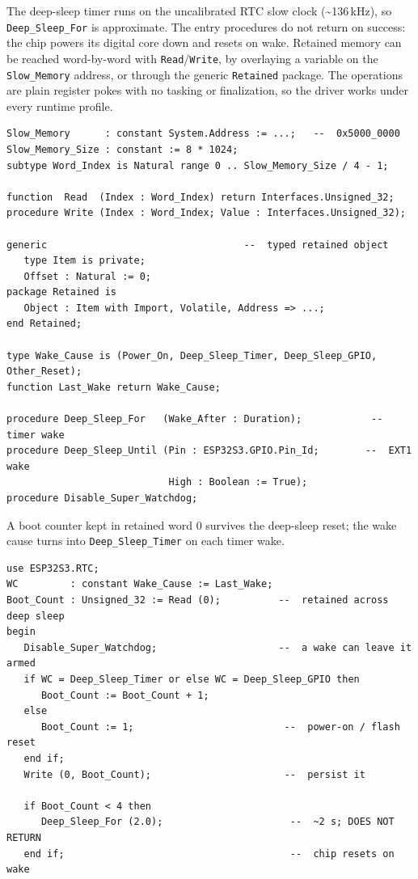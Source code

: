 The deep-sleep timer runs on the uncalibrated RTC slow clock
(\textasciitilde136\,kHz), so \texttt{Deep\_Sleep\_For} is approximate. The entry
procedures do not return on success: the chip powers its digital core down and
resets on wake. Retained memory can be reached word-by-word with
\texttt{Read}/\texttt{Write}, by overlaying a variable on the \texttt{Slow\_Memory}
address, or through the generic \texttt{Retained} package. The operations are plain
register pokes with no tasking or finalization, so the driver works under every
runtime profile.

\begin{lstlisting}
Slow_Memory      : constant System.Address := ...;   --  0x5000_0000
Slow_Memory_Size : constant := 8 * 1024;
subtype Word_Index is Natural range 0 .. Slow_Memory_Size / 4 - 1;

function  Read  (Index : Word_Index) return Interfaces.Unsigned_32;
procedure Write (Index : Word_Index; Value : Interfaces.Unsigned_32);

generic                                  --  typed retained object
   type Item is private;
   Offset : Natural := 0;
package Retained is
   Object : Item with Import, Volatile, Address => ...;
end Retained;

type Wake_Cause is (Power_On, Deep_Sleep_Timer, Deep_Sleep_GPIO, Other_Reset);
function Last_Wake return Wake_Cause;

procedure Deep_Sleep_For   (Wake_After : Duration);            --  timer wake
procedure Deep_Sleep_Until (Pin : ESP32S3.GPIO.Pin_Id;        --  EXT1 wake
                            High : Boolean := True);
procedure Disable_Super_Watchdog;
\end{lstlisting}

A boot counter kept in retained word 0 survives the deep-sleep reset; the wake
cause turns into \texttt{Deep\_Sleep\_Timer} on each timer wake.

\begin{lstlisting}
use ESP32S3.RTC;
WC         : constant Wake_Cause := Last_Wake;
Boot_Count : Unsigned_32 := Read (0);          --  retained across deep sleep
begin
   Disable_Super_Watchdog;                     --  a wake can leave it armed
   if WC = Deep_Sleep_Timer or else WC = Deep_Sleep_GPIO then
      Boot_Count := Boot_Count + 1;
   else
      Boot_Count := 1;                          --  power-on / flash reset
   end if;
   Write (0, Boot_Count);                       --  persist it

   if Boot_Count < 4 then
      Deep_Sleep_For (2.0);                      --  ~2 s; DOES NOT RETURN
   end if;                                       --  chip resets on wake
\end{lstlisting}

